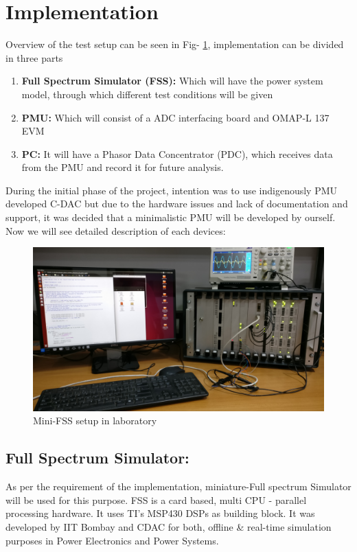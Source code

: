 \section{Implementation}
Overview of the test setup can be seen in Fig- \ref{fig:fss_setup}, implementation can be divided in three parts
\begin{enumerate}
\item \textbf{Full Spectrum Simulator (FSS):} Which will have the power system model, through which different test conditions will be given
\item \textbf{PMU:} Which will consist of a ADC interfacing board and OMAP-L 137 EVM
\item \textbf{PC:} It will have a Phasor Data Concentrator (PDC), which receives data from the PMU and record it for future analysis.
\end{enumerate}
During the initial phase of the project, intention was to use indigenously PMU developed C-DAC but due to the hardware issues and lack of documentation and support, it was decided that a minimalistic PMU will be developed by ourself. Now we will see detailed description of each devices: 

\begin{figure}[th]
\centering
\includegraphics[width=\textwidth]{fig/FSS_setup.jpg}
\caption{Mini-FSS setup in laboratory}
\label{fig:fss_setup}
\end{figure}

\subsection{Full Spectrum Simulator:}
As per the requirement of the implementation, miniature-Full spectrum Simulator will be used for this purpose. FSS is a card based, multi CPU - parallel processing hardware. It uses TI's MSP430 DSPs as building block. It was developed by IIT Bombay and CDAC for both, offline \& real-time  simulation purposes in Power Electronics and Power Systems.


